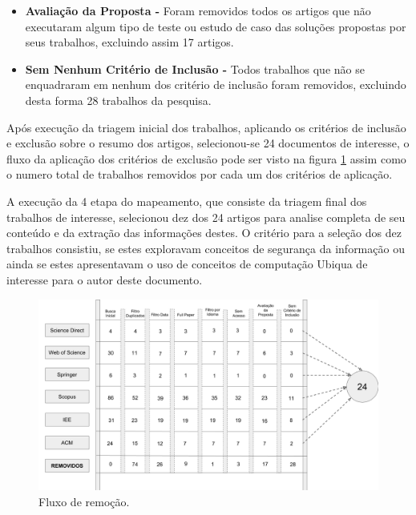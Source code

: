 \documentclass[tid,table]{texufpel} %
\begin{document}
\begin{itemize}
	\item  \textbf{Avaliação da Proposta - } Foram removidos todos os artigos que não executaram algum tipo de teste ou estudo de caso das soluções propostas por seus trabalhos, excluindo assim 17 artigos.
	
	\item  \textbf{Sem Nenhum Critério de Inclusão - } Todos trabalhos que não  se enquadraram em nenhum dos critério de inclusão foram removidos, excluindo desta forma 28 trabalhos da pesquisa.	

\end{itemize}


Após execução da triagem inicial dos trabalhos, aplicando os critérios de inclusão e exclusão sobre o resumo dos artigos, selecionou-se 24 documentos de interesse, o fluxo da aplicação dos critérios de exclusão pode ser visto na figura \ref{fig:grafFluxoTriagemInicial} assim como o numero total de trabalhos removidos por cada um dos critérios de aplicação. 

A execução da 4 etapa do mapeamento, que consiste da triagem final dos trabalhos de interesse, selecionou dez dos 24 artigos para analise completa de seu conteúdo e da extração das informações destes. O critério para a seleção dos dez trabalhos consistiu, se estes exploravam conceitos de segurança da informação ou ainda se estes apresentavam o uso de conceitos de computação Ubiqua de interesse para o autor deste documento.    


\begin{landscape}
\begin{figure}[ht]
	\centering
	\includegraphics[width=1.7\textwidth]{imagens/FluxoTriagemInicial.png}
	\caption{Fluxo de remoção.}
	\label{fig:grafFluxoTriagemInicial}
\end{figure}
\end{landscape}
\end{document}
